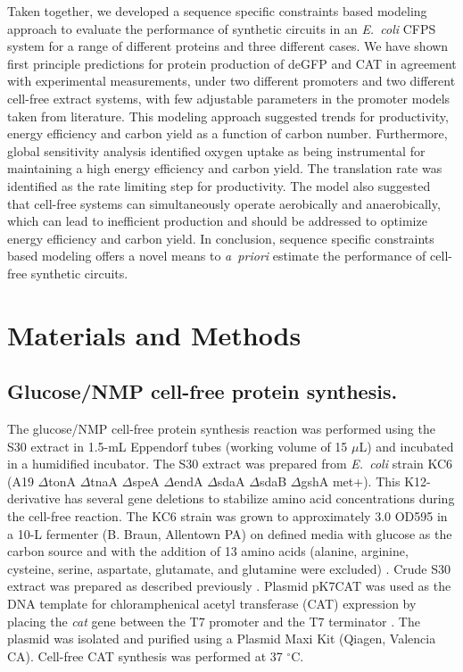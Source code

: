 \documentclass[journal=asbcd6,manuscript=article]{achemso}
\begin{document}
Taken together, we developed a sequence specific constraints based modeling approach to evaluate the performance of synthetic circuits in an \emph{E.~coli} CFPS system for a range of different proteins and three different cases.
We have shown first principle predictions for protein production of deGFP and CAT in agreement with experimental measurements, under two different promoters and two different cell-free extract systems, with few adjustable parameters in the promoter models taken from literature.
This modeling approach suggested trends for productivity, energy efficiency and carbon yield as a function of carbon number.
Furthermore, global sensitivity analysis identified oxygen uptake as being instrumental for maintaining a high energy efficiency and carbon yield.
The translation rate was identified as the rate limiting step for productivity.
The model also suggested that cell-free systems can simultaneously operate aerobically and anaerobically, which can lead to inefficient production and should be addressed to optimize energy efficiency and carbon yield.
In conclusion, sequence specific constraints based modeling offers a novel means to \emph{a~priori} estimate the performance of cell-free synthetic circuits.

\clearpage

\section*{Materials and Methods}

\subsection*{Glucose/NMP cell-free protein synthesis.}
The glucose/NMP cell-free protein synthesis reaction was
performed using the S30 extract in 1.5-mL Eppendorf tubes (working volume of 15 $\mu$L) and incubated in a humidified incubator.
The S30 extract was prepared from \textit{E.~coli} strain KC6 (A19 $\Delta$tonA $\Delta$tnaA $\Delta$speA $\Delta$endA $\Delta$sdaA $\Delta$sdaB $\Delta$gshA met+).
This K12-derivative has several gene deletions to stabilize amino acid concentrations during the cell-free reaction.
The KC6 strain was grown to approximately 3.0 OD595 in a 10-L fermenter (B. Braun, Allentown PA) on defined media with glucose as the carbon source and with the addition of 13 amino acids (alanine, arginine, cysteine, serine, aspartate, glutamate, and glutamine were excluded) \cite{Zawada:2003}. Crude S30 extract was prepared as described previously \cite{Jewett:2002}.
Plasmid pK7CAT was used as the DNA template for chloramphenical acetyl transferase (CAT) expression by placing the \emph{cat} gene
between the T7 promoter and the T7 terminator \cite{Kigawa1995}.
The plasmid was isolated and purified using a Plasmid Maxi Kit (Qiagen, Valencia CA).
Cell-free CAT synthesis was performed at 37 $^{\circ}$C.
\end{document}
